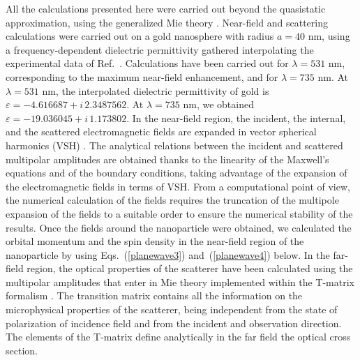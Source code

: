 \documentclass[journal=apchd5,manuscript=article]{achemso}
\begin{document}
All the calculations presented here were carried out beyond the quasistatic approximation, using the generalized Mie theory \cite{borghese2007scattering,borghese2013superposition}. Near-field and scattering calculations were carried out on a gold nanosphere with radius $a=40$ nm, using a frequency-dependent dielectric permittivity gathered interpolating the experimental data of Ref.~. Calculations have been carried out 
for $\lambda = 531$ nm,  corresponding to the maximum near-field enhancement, and for $\lambda = 735$ nm. At $\lambda = 531$ nm, the interpolated dielectric permittivity of gold is $\varepsilon = -4.616687 + i\,2.3487562$. At $\lambda = 735$ nm, we obtained $\varepsilon = -19.036045 + i\,1.173802$.
In the near-field region, the incident, the internal, and the scattered electromagnetic fields are expanded in vector spherical harmonics (VSH) \cite{borghese2007scattering}. The analytical relations between the incident and scattered multipolar amplitudes are obtained thanks to the linearity of the Maxwell's equations and of the boundary conditions, taking advantage of the expansion of the electromagnetic fields in terms of VSH. From a computational point of view, the numerical calculation of the fields requires the truncation of the multipole expansion of the fields to a suitable order to ensure the numerical stability of the results. Once the fields around the nanoparticle were obtained, we calculated the orbital momentum and the spin density in the near-field region of the nanoparticle by using Eqs.~(\ref{planewave3}) and~(\ref{planewave4}) below. 
In the far-field region, the optical properties of the scatterer have been calculated using the multipolar amplitudes that enter in Mie theory implemented within the T-matrix formalism \cite{borghese2007scattering,borghese2013superposition}. The transition matrix contains all the information on the microphysical properties of the scatterer, being independent from the state of polarization of incidence field and from the incident and observation direction. The elements of the T-matrix define analytically in the far field the optical cross section.
\end{document}
